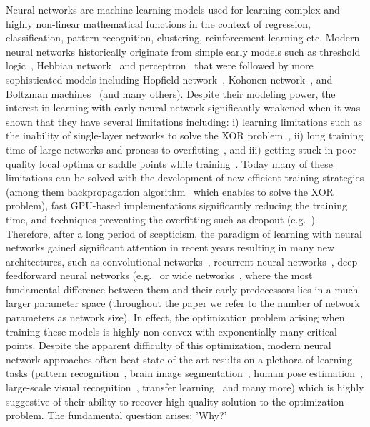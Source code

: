 \documentclass[twoside]{article}
\begin{document}
Neural networks are machine learning models used for learning complex and highly non-linear mathematical functions in the context of regression, classification, pattern recognition, clustering, reinforcement learning etc. Modern neural networks historically originate from simple early models such as threshold logic~\cite{mcculloch43a}, Hebbian network~\cite{Hebb:1949} and perceptron~\cite{rosenblatt58a} that were followed by more sophisticated models including Hopfield network~\cite{Hopfield:1988:NNP:65669.104422}, Kohonen network~\cite{Kohonen1982}, and Boltzman machines~\cite{Hinton:1986:LRB:104279.104291} (and many others). Despite their modeling power, the interest in learning with early neural network significantly weakened when it was shown that they have several limitations including: i) learning limitations such as the inability of single-layer networks to solve the XOR problem~\cite{minsky69perceptrons}, ii) long training time of large networks and proness to overfitting~\cite{JMLR:v15:srivastava14a}, and iii) getting stuck in poor-quality local optima or saddle points while training~\cite{Larochelle:2009:EST:1577069.1577070}. Today many of these limitations can be solved with the development of new efficient training strategies (among them backpropagation algorithm~\cite{Werbos:74} which enables to solve the XOR problem), fast GPU-based implementations significantly reducing the training time, and techniques preventing the overfitting such as dropout (e.g.~\cite{JMLR:v15:srivastava14a}). Therefore, after a long period of scepticism, the paradigm of learning with neural networks gained significant attention in recent years resulting in many new architectures, such as convolutional networks~\cite{lecun-gradientbased-learning-applied-1998}, recurrent neural networks~\cite{Graves:2009:NCS:1525650.1525782}, deep feedforward neural networks (e.g.~\cite{DBLP:journals/corr/Schmidhuber14} or wide networks~\cite{Huang14}, where the most fundamental difference between them and their early predecessors lies in a much larger parameter space (throughout the paper we refer to the number of network parameters as network size). In effect, the optimization problem arising when training these models is highly non-convex with exponentially many critical points. Despite the apparent difficulty of this optimization, modern neural network approaches often beat state-of-the-art results on a plethora of learning tasks (pattern recognition~\cite{journals/nn/CiresanMMS12}, brain image segmentation~\cite{NIPS2012_4741}, human pose estimation~\cite{DBLP:journals/corr/TompsonJLB14}, large-scale visual recognition~\cite{sermanet-iclr-14}, transfer learning~\cite{conf/icml/GoodfellowCB12} and many more) which is highly suggestive of their ability to recover high-quality solution to the optimization problem. The fundamental question arises: 'Why?' 
\end{document}
